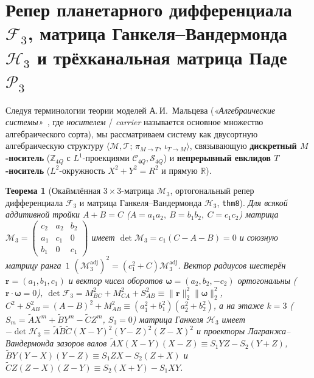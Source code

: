 \documentclass[11pt,a4paper]{article}
\theoremstyle{plain}
\newtheorem{theorem}{Теорема}[section]
\theoremstyle{definition}
\begin{document}
\section{Репер планетарного дифференциала \texorpdfstring{$\mathcal{F}_3$}{F3}, матрица Ганкеля--Вандермонда \texorpdfstring{$\mathcal{H}_3$}{H3} и трёхканальная матрица Паде \texorpdfstring{$\mathcal{P}_3$}{P3}}
\label{sec:planetary-frame}

Следуя терминологии теории моделей А.\,И.~Мальцева (\emph{«Алгебраические системы»}~\cite{Malcev1970}, где \emph{носителем} / \emph{carrier} называется основное множество алгебраического сорта), мы рассматриваем систему как двусортную алгебраическую структуру $\langle\mathcal{M},\mathcal{T};\,\pi_{M\to T},\,\iota_{T\to M}\rangle$, связывающую \textbf{дискретный $M$-носитель} ($\mathbb{Z}_{4Q}$ с $L^1$-проекциями $\mathcal{C}_{4Q},\mathcal{S}_{4Q}$) и \textbf{непрерывный евклидов $T$-носитель} ($L^2$-окружность $X^2+Y^2=R^2$ и прямую $\mathbb{R}$).

\begin{theorem}[Окаймлённая $3\times 3$-матрица $\mathcal{M}_3$, ортогональный репер дифференциала $\mathcal{F}_3$ и матрица Ганкеля--Вандермонда $\mathcal{H}_3$, \texttt{thm8}]
\label{thm:main-8}
Для всякой аддитивной тройки $A + B = C$ ($A = a_1 a_2,\ B = b_1 b_2,\ C = c_1 c_2$) матрица $\mathcal{M}_3 = \begin{pmatrix} c_2 & a_2 & b_2 \\ a_1 & c_1 & 0 \\ b_1 & 0 & c_1 \end{pmatrix}$ имеет $\det\mathcal{M}_3 = c_1(C-A-B) = 0$ и союзную матрицу ранга~$1$ $(\mathcal{M}_3^{\mathrm{adj}})^2 = (c_1^2+C)\mathcal{M}_3^{\mathrm{adj}}$. Вектор радиусов шестерён $\mathbf{r} = (a_1,b_1,c_1)$ и вектор чисел оборотов $\mathbf{\omega} = (a_2,b_2,-c_2)$ ортогональны ($\mathbf{r}\cdot\mathbf{\omega} = 0$), $\det\mathcal{F}_3 = M_{BC}^2 + M_{CA}^2 + S_{AB}^2 \equiv \|\mathbf{r}\|_2^2\|\mathbf{\omega}\|_2^2$, $C^2 + S_{AB}^2 = (A-B)^2 + M_{AB}^2 \equiv (a_1^2+b_1^2)(a_2^2+b_2^2)$, а на этаже $k=3$ ($S_m = \widetilde{A}X^m + \widetilde{B}Y^m - \widetilde{C}Z^m$, $S_3 = 0$) матрица Ганкеля $\mathcal{H}_3$ имеет $-\det\mathcal{H}_3 \equiv \widetilde{A}\widetilde{B}\widetilde{C}(X-Y)^2(Y-Z)^2(Z-X)^2$ и проекторы Лагранжа--Вандермонда зазоров валов $\widetilde{A}X(X-Y)(X-Z) \equiv S_1 YZ - S_2(Y+Z)$, $\widetilde{B}Y(Y-X)(Y-Z) \equiv S_1 ZX - S_2(Z+X)$ и $\widetilde{C}Z(Z-X)(Z-Y) \equiv S_2(X+Y) - S_1 XY$.
\end{theorem}
\end{document}
